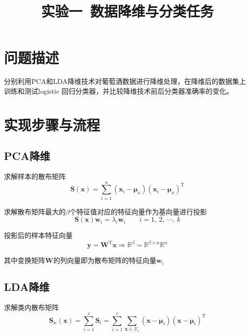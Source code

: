 \documentclass[notitlepage]{article}
\title{实验一\ 数据降维与分类任务}
\author{}
\date{}
\begin{document}
\maketitle

\vspace{-7em}

\section{问题描述}

分别利用PCA和LDA降维技术对葡萄酒数据进行降维处理，在降维后的数据集上训练和测试logistic
回归分类器，并比较降维技术前后分类器准确率的变化。

\section{实现步骤与流程}

\subsection*{PCA降维}

求解样本的散布矩阵
\begin{equation*}
    \mathbf{S}(\boldsymbol{x}) = \sum_{i = 1}^{n} 
    (\boldsymbol{x}_{i} - \boldsymbol{\mu}_{x})
    (\boldsymbol{x}_{i} - \boldsymbol{\mu}_{x})^{\mathrm{T}}
\end{equation*}

求解散布矩阵最大的$\beta$个特征值对应的特征向量作为基向量进行投影
\begin{equation*}
    \mathbf{S}(\boldsymbol{x}) \boldsymbol{w}_{i} 
    = \lambda_{i} \boldsymbol{w}_{i}
    \qquad i = 1,\ 2,\ \cdots,\ k
\end{equation*}

投影后的样本特征向量
\begin{equation*}
    \boldsymbol{y} = \mathbf{W}^{\mathrm{T}} \boldsymbol{x} 
    \Rightarrow \mathbb{R}^{\beta} 
    = \mathbb{R}^{\beta \times \alpha} \mathbb{R}^{\alpha}
\end{equation*}

其中变换矩阵$\mathbf{W}$的列向量即为散布矩阵的特征向量$\boldsymbol{w}_{i}$

\subsection*{LDA降维}

求解类内散布矩阵
\begin{equation*}
    \mathbf{S}_{w}(\boldsymbol{x}) = \sum_{i = 1}^{c} \mathbf{S}_{i} = 
    \sum_{i = 1}^{c} \sum_{\boldsymbol{x} \in \mathcal{X}_{i}} 
    (\boldsymbol{x} - \boldsymbol{\mu}_{i})(\boldsymbol{x} - 
    \boldsymbol{\mu}_{i})^{\mathrm{T}}
\end{equation*}
\end{document}
